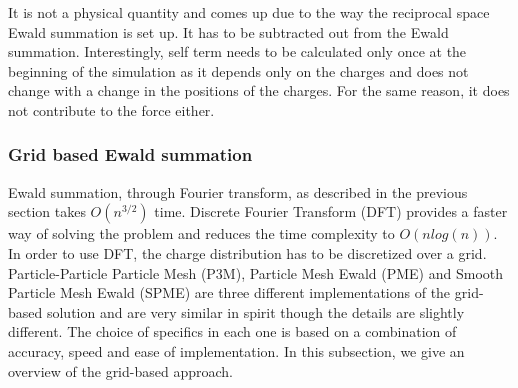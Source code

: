 \documentclass[9pt,bestpractices]{livecoms}
\begin{document}
It is not a physical quantity and comes up due to the way the reciprocal space Ewald summation is set up. 
It has to be subtracted out from the Ewald summation. 
Interestingly, self term needs to be calculated only once at the beginning of the simulation as it depends only on the charges and does not change with a change in the positions of the charges. For the same reason, it does not contribute to the force either. 


\subsubsection{Grid based Ewald summation}

Ewald summation, through Fourier transform, as described in the previous section takes $O(n^{3/2})$ time. Discrete Fourier Transform (DFT) provides a  faster way of solving the problem and reduces the time complexity to $O(n log(n))$. In order to use DFT, the charge distribution has to be discretized over a grid. Particle-Particle Particle Mesh (P3M), Particle Mesh Ewald (PME) and Smooth Particle Mesh Ewald (SPME) are three different implementations of the grid-based solution and are very similar in spirit though the details are slightly different. The choice of specifics in each one is based on a combination of accuracy, speed and ease of implementation. In this subsection, we give an overview of the grid-based approach.
\end{document}
